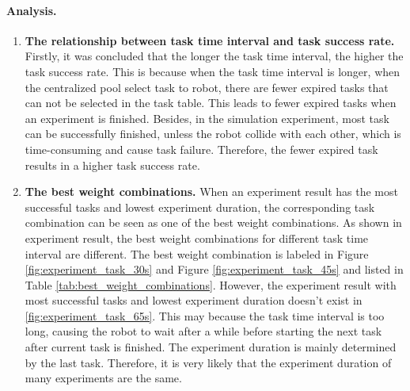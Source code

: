 \paragraph{Analysis.} 
\begin{enumerate}
 \item \textbf{The relationship between task time interval and task success rate.} Firstly, it was concluded that the longer the task time interval, the higher the task success rate.
 This is because when the task time interval is longer, when the centralized pool select task to robot, there are fewer expired tasks that can not be selected in the task table. This leads to fewer expired tasks when an experiment is finished. Besides, in the simulation experiment, most task can be successfully finished, unless the robot collide with each other, which is time-consuming and cause task failure. Therefore, the fewer expired task results in a higher task success rate.
 \item \textbf{The best weight combinations.} When an experiment result has the most successful tasks and lowest experiment duration, the corresponding task combination can be seen as one of the best weight combinations. As shown in experiment result, the best weight combinations for different task time interval are different. 
 The best weight combination is labeled in Figure \ref{fig:experiment_task_30s} and Figure \ref{fig:experiment_task_45s} and listed in Table \ref{tab:best_weight_combinations}. However, the experiment result with most successful tasks and lowest experiment duration doesn't exist in \ref{fig:experiment_task_65s}. This may because the task time interval is too long, causing the robot to wait after a while before starting the next task after current task is finished. The experiment duration is mainly determined by the last task. Therefore, it is very likely that the experiment duration of many experiments are the same.
\begin{table}[htb]
 \centering
 \caption{Best weight combinations}
 \label{tab:best_weight_combinations}
 \end{table}
\end{enumerate}

